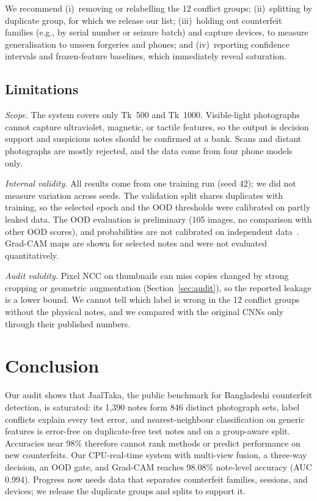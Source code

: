 \documentclass[pdflatex,iicol,sn-mathphys-num]{sn-jnl}
\begin{document}
We recommend (i)~removing or relabelling the 12 conflict groups; (ii)~splitting by
duplicate group, for which we release our list; (iii)~holding out counterfeit families
(e.g., by serial number or seizure batch) and capture devices, to measure generalisation
to unseen forgeries and phones; and (iv)~reporting confidence intervals and
frozen-feature baselines, which immediately reveal saturation.

\subsection{Limitations}\label{sec:limits}

\emph{Scope.} The system covers only Tk~500 and Tk~1000. Visible-light photographs
cannot capture ultraviolet, magnetic, or tactile features, so the output is decision
support and suspicious notes should be confirmed at a bank. Scans and distant
photographs are mostly rejected, and the data come from four phone models only.

\emph{Internal validity.} All results come from one training run (seed 42); we did not
measure variation across seeds. The validation split shares duplicates with training,
so the selected epoch and the OOD thresholds were calibrated on partly leaked data. The
OOD evaluation is preliminary (105 images, no comparison with other OOD scores), and
probabilities are not calibrated on independent data~\cite{guo2017calibration}.
Grad-CAM maps are shown for selected notes and were not evaluated quantitatively.

\emph{Audit validity.} Pixel NCC on thumbnails can miss copies changed by strong
cropping or geometric augmentation (Section~\ref{sec:audit}), so the reported leakage is
a lower bound. We cannot tell which label is wrong in the 12 conflict groups without the
physical notes, and we compared with the original CNNs only through their published
numbers.

\section{Conclusion}\label{sec:conclusion}

Our audit shows that JaalTaka, the public benchmark for Bangladeshi counterfeit
detection, is saturated: its 1{,}390 notes form 846 distinct photograph sets, label
conflicts explain every test error, and nearest-neighbour classification on generic
features is error-free on duplicate-free test notes and on a group-aware split.
Accuracies near 98\% therefore cannot rank methods or predict performance on new
counterfeits. Our CPU-real-time system with multi-view fusion, a three-way decision, an
OOD gate, and Grad-CAM reaches 98.08\% note-level accuracy (AUC 0.994). Progress now
needs data that separates counterfeit families, sessions, and devices; we release the
duplicate groups and splits to support it.
\end{document}

